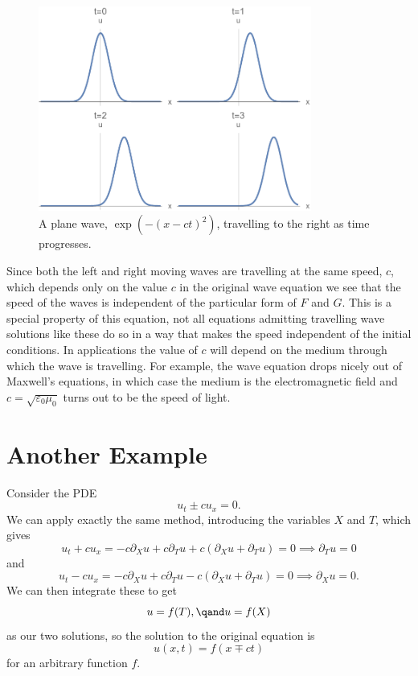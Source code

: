 \documentclass[fleqn]{NotesClass}
\begin{document}
    \begin{figure}
        \includegraphics[width=0.8\textwidth]{images/travelling-plane-wave}
        \caption[travelling plane wave]{A plane wave, \(\exp(-(x - ct)^2)\), travelling to the right as time progresses.}
        \label{fig:travelling plane wave}
    \end{figure}
    
    Since both the left and right moving waves are travelling at the same speed, \(c\), which depends only on the value \(c\) in the original wave equation we see that the speed of the waves is independent of the particular form of \(F\) and \(G\).
    This is a special property of this equation, not all equations admitting travelling wave solutions like these do so in a way that makes the speed independent of the initial conditions.
    In applications the value of \(c\) will depend on the medium through which the wave is travelling.
    For example, the wave equation drops nicely out of Maxwell's equations, in which case the medium is the electromagnetic field and \(c = \sqrt{\varepsilon_0 \mu_0}\) turns out to be the speed of light.
    
    \section{Another Example}
    Consider the PDE
    \begin{equation}
        u_t \pm c u_x = 0.
    \end{equation}
    We can apply exactly the same method, introducing the variables \(X\) and \(T\), which gives
    \begin{equation}
        u_t + cu_x = -c\partial_Xu + c\partial_Tu + c(\partial_X u + \partial_T u) = 0 \implies \partial_T u = 0
    \end{equation}
    and
    \begin{equation}
        u_t - cu_x = -c\partial_Xu + c\partial_Tu - c(\partial_X u + \partial_T u) = 0 \implies \partial_X u = 0.
    \end{equation}
    We can then integrate these to get
    \begin{equation}
        u = f(T), \qand u = f(X)
    \end{equation}
    as our two solutions, so the solution to the original equation is
    \begin{equation}
        u(x, t) = f(x \mp ct)
    \end{equation}
    for an arbitrary function \(f\).
    
\end{document}
